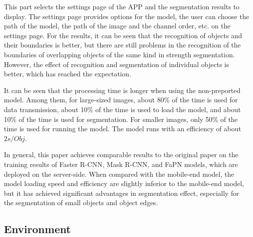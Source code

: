 
This part selects the settings page of the APP and the segmentation results to display. The settings page provides options for the model, the user can choose the path of the model, the path of the image and the channel order, etc. on the settings page. For the results, it can be seen that the recognition of objects and their boundaries is better, but there are still problems in the recognition of the boundaries of overlapping objects of the same kind in strength segmentation. However, the effect of recognition and segmentation of individual objects is better, which has reached the expectation.


It can be seen that the processing time is longer when using the non-preported model. Among them, for large-sized images, about 80\% of the time is used for data transmission, about 10\% of the time is used to load the model, and about 10\% of the time is used for segmentation. For smaller images, only 50\% of the time is used for running the model. The model runs with an efficiency of about $2s/Obj$.


In general, this paper achieves comparable results to the original paper on the training results of Faster R-CNN, Mask R-CNN, and FaPN models, which are deployed on the server-side. When compared with the mobile-end model, the model loading speed and efficiency are slightly inferior to the mobile-end model, but it has achieved significant advantages in segmentation effect, especially for the segmentation of small objects and object edges.

\subsection{Environment}

